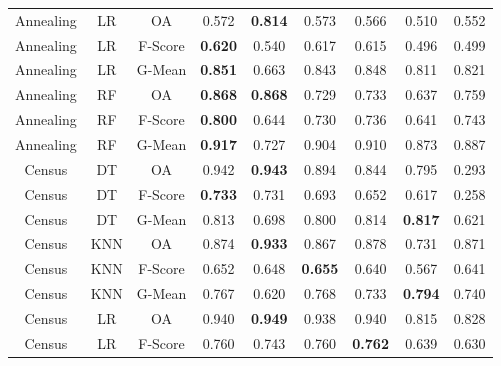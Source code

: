 \begin{longtable}{ccccccccc}
         Annealing &         LR &      OA &          0.572 & \textbf{0.814} &          0.573 &          0.566 &          0.510 &          0.552 \\
         Annealing &         LR & F-Score & \textbf{0.620} &          0.540 &          0.617 &          0.615 &          0.496 &          0.499 \\
         Annealing &         LR &  G-Mean & \textbf{0.851} &          0.663 &          0.843 &          0.848 &          0.811 &          0.821 \\
         Annealing &         RF &      OA & \textbf{0.868} & \textbf{0.868} &          0.729 &          0.733 &          0.637 &          0.759 \\
         Annealing &         RF & F-Score & \textbf{0.800} &          0.644 &          0.730 &          0.736 &          0.641 &          0.743 \\
         Annealing &         RF &  G-Mean & \textbf{0.917} &          0.727 &          0.904 &          0.910 &          0.873 &          0.887 \\
            Census &         DT &      OA &          0.942 & \textbf{0.943} &          0.894 &          0.844 &          0.795 &          0.293 \\
            Census &         DT & F-Score & \textbf{0.733} &          0.731 &          0.693 &          0.652 &          0.617 &          0.258 \\
            Census &         DT &  G-Mean &          0.813 &          0.698 &          0.800 &          0.814 & \textbf{0.817} &          0.621 \\
            Census &        KNN &      OA &          0.874 & \textbf{0.933} &          0.867 &          0.878 &          0.731 &          0.871 \\
            Census &        KNN & F-Score &          0.652 &          0.648 & \textbf{0.655} &          0.640 &          0.567 &          0.641 \\
            Census &        KNN &  G-Mean &          0.767 &          0.620 &          0.768 &          0.733 & \textbf{0.794} &          0.740 \\
            Census &         LR &      OA &          0.940 & \textbf{0.949} &          0.938 &          0.940 &          0.815 &          0.828 \\
            Census &         LR & F-Score &          0.760 &          0.743 &          0.760 & \textbf{0.762} &          0.639 &          0.630 \\

\end{longtable}
